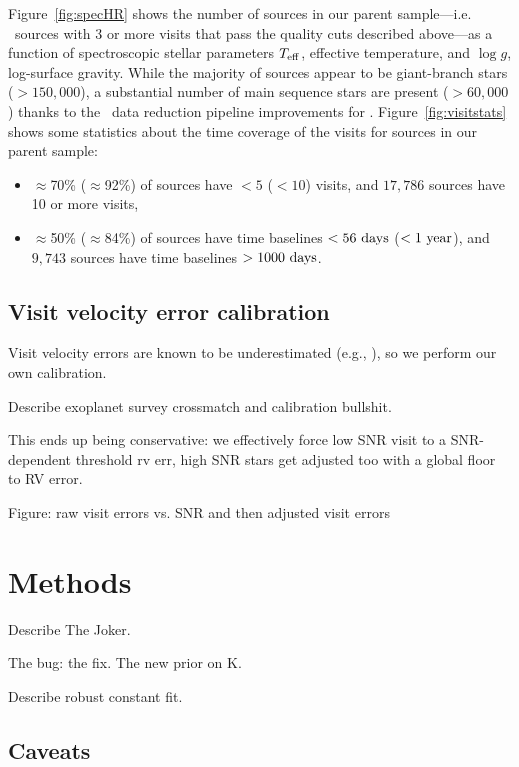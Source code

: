 \documentclass[modern]{aastex62}
\begin{document}
Figure~\ref{fig:specHR} shows the number of sources in our parent sample---i.e.
\apogee\ sources with 3 or more visits that pass the quality cuts described
above---as a function of spectroscopic stellar parameters $T_{\rm eff}$,
effective temperature, and $\log g$, log-surface gravity.
While the majority of sources appear to be giant-branch stars ($>150,000$), a
substantial number of main sequence stars are present ($>60,000$) thanks to the
\apogee\ data reduction pipeline improvements for .
Figure~\ref{fig:visitstats} shows some statistics about the time coverage of the
visits for sources in our parent sample:
\begin{itemize}
    \item $\approx$70\% ($\approx$92\%) of sources have $<5$ ($<10$) visits, and
    $17,786$ sources have 10 or more visits,
    \item $\approx$50\% ($\approx$84\%) of sources have time baselines $<56~{\rm days}$ ($<1~{\rm year}$), and $9,743$ sources have time baselines $>1000~{\rm days}$.
\end{itemize}


\subsection{Visit velocity error calibration} \label{sec:visitcalib}

Visit velocity errors are known to be underestimated (e.g., \citealt{}), so we perform our own calibration.

Describe exoplanet survey crossmatch and calibration bullshit.

This ends up being conservative: we effectively force low SNR visit to a SNR-dependent threshold rv err, high SNR stars get adjusted too with a global floor to RV error.

Figure: raw visit errors vs. SNR and then adjusted visit errors


\section{Methods} \label{sec:methods}

Describe The Joker.

The bug: the fix. The new prior on K.

Describe robust constant fit.

\subsection{Caveats} \label{sec:caveats}
\end{document}
